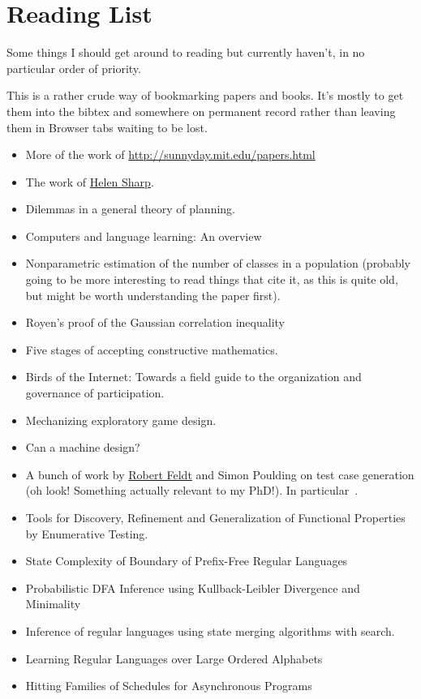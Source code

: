 \documentclass[a4paper]{book}
\begin{document}
\chapter{Reading List}

Some things I should get around to reading but currently haven't,
in no particular order of priority.

This is a rather crude way of bookmarking papers and books.
It's mostly to get them into the bibtex and somewhere on permanent record rather than leaving them in Browser tabs waiting to be lost.


\begin{itemize}
\item More of the work of \href{Nancy Leveson}{http://sunnyday.mit.edu/papers.html}
\item The work of \href{http://mcs.open.ac.uk/hcs2/}{Helen Sharp}.
\item Dilemmas in a general theory of planning\cite{rittel1973dilemmas}.
\item Computers and language learning: An overview\cite{warschauer1998computers}
\item Nonparametric estimation of the number of classes in a population\cite{chao1984nonparametric} (probably going to be more interesting to read things that cite it, as this is quite old, but might be worth understanding the paper first).
\item Royen’s proof of the Gaussian correlation inequality\cite{latala2017royen}
\item Five stages of accepting constructive mathematics\cite{bauer2017five}.
\item Birds of the Internet: Towards a field guide to the organization and governance of participation\cite{fish2011birds}.
\item Mechanizing exploratory game design\cite{smith2012mechanizing}.
\item Can a machine design?\cite{cross2001can}
\item A bunch of work by \href{http://www.robertfeldt.net/}{Robert Feldt} and Simon Poulding on test case generation
(oh look! Something actually relevant to my PhD!).
In particular~\cite{DBLP:conf/icst/PouldingF15, DBLP:conf/issre/FeldtP13, DBLP:conf/icse/FeldtP15}.
\item Tools for Discovery, Refinement and Generalization of Functional Properties by Enumerative Testing\cite{matela2017tools}.
\item State Complexity of Boundary of Prefix-Free Regular Languages\cite{DBLP:journals/ijfcs/EomH15}
\item Probabilistic DFA Inference using Kullback-Leibler Divergence and Minimality\cite{DBLP:conf/icml/ThollardDH00}
\item Inference of regular languages using state merging algorithms with search\cite{DBLP:journals/pr/BugalhoO05}.
\item Learning Regular Languages over Large Ordered Alphabets\cite{DBLP:journals/corr/MensM15}
\item Hitting Families of Schedules for Asynchronous Programs\cite{DBLP:conf/cav/ChistikovMN16}
\end{itemize}

{}

\end{document}
